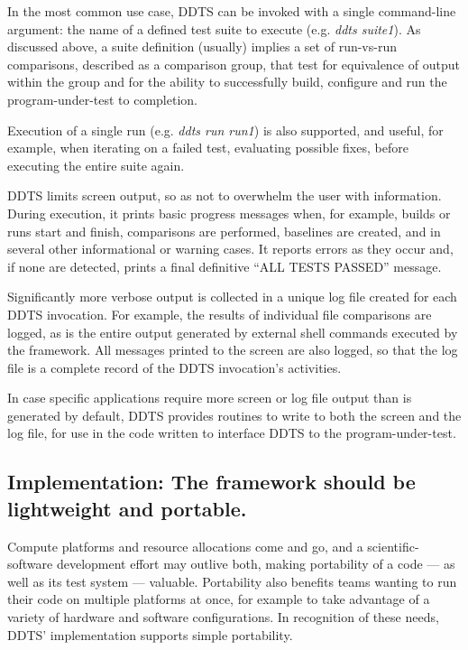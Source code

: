 \documentclass[conference]{IEEEtran}
\begin{document}
In the most common use case, DDTS can be invoked with a single command-line argument: the name of a defined test suite to execute (e.g. \emph{ddts suite1}). As discussed above, a suite definition (usually) implies a set of run-vs-run comparisons, described as a comparison group, that test for equivalence of output within the group and for the ability to successfully build, configure and run the program-under-test to completion.

Execution of a single run (e.g. \emph{ddts run run1}) is also supported, and useful, for example, when iterating on a failed test, evaluating possible fixes, before executing the entire suite again.

DDTS limits screen output, so as not to overwhelm the user with information. During execution, it prints basic progress messages when, for example, builds or runs start and finish, comparisons are performed, baselines are created, and in several other informational or warning cases. It reports errors as they occur and, if none are detected, prints a final definitive ``ALL TESTS PASSED'' message.

Significantly more verbose output is collected in a unique log file created for each DDTS invocation. For example, the results of individual file comparisons are logged, as is the entire output generated by external shell commands executed by the framework. All messages printed to the screen are also logged, so that the log file is a complete record of the DDTS invocation's activities.

In case specific applications require more screen or log file output than is generated by default, DDTS provides routines to write to both the screen and the log file, for use in the code written to interface DDTS to the program-under-test.

\subsection{Implementation: The framework should be lightweight and portable.}

Compute platforms and resource allocations come and go, and a scientific-software development effort may outlive both, making portability of a code --- as well as its test system --- valuable. Portability also benefits teams wanting to run their code on multiple platforms at once, for example to take advantage of a variety of hardware and software configurations. In recognition of these needs, DDTS' implementation supports simple portability.
\end{document}
